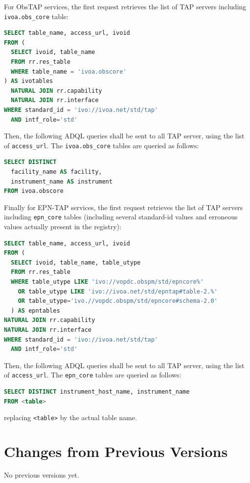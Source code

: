 \documentclass[11pt,a4paper]{ivoa}
\begin{document}
For ObsTAP services, the first request retrieves the list of TAP
servers including \texttt{ivoa.obs\_core} table:

\begin{lstlisting}[language=SQL]
SELECT table_name, access_url, ivoid 
FROM ( 
  SELECT ivoid, table_name 
  FROM rr.res_table 
  WHERE table_name = 'ivoa.obscore'
) AS ivotables
  NATURAL JOIN rr.capability
  NATURAL JOIN rr.interface 
WHERE standard_id = 'ivo://ivoa.net/std/tap' 
  AND intf_role='std'
\end{lstlisting}

Then, the following ADQL queries shall be sent to all TAP server, 
using the list of \texttt{access\_url}. The \texttt{ivoa.obs\_core} 
tables are queried as follows: 

\begin{lstlisting}[language=SQL]
SELECT DISTINCT 
  facility_name AS facility, 
  instrument_name AS instrument 
FROM ivoa.obscore
\end{lstlisting}

Finally for EPN-TAP services, the first request retrieves the list of TAP
servers including \texttt{epn\_core} tables (including several standard-id 
values and erroneous values actually present in the registry): 

\begin{lstlisting}[language=SQL]
SELECT table_name, access_url, ivoid 
FROM ( 
  SELECT ivoid, table_name, table_utype 
  FROM rr.res_table 
  WHERE table_utype LIKE 'ivo://vopdc.obspm/std/epncore%' 
    OR table_utype LIKE 'ivo://ivoa.net/std/epntap#table-2.%' 
    OR table_utype='ivo.//vopdc.obspm/std/epncore#schema-2.0'
  ) AS epntables
NATURAL JOIN rr.capability
NATURAL JOIN rr.interface 
WHERE standard_id = 'ivo://ivoa.net/std/tap' 
  AND intf_role='std'
\end{lstlisting}

Then, the following ADQL queries shall be sent to all TAP server, 
using the list of \texttt{access\_url}. The \texttt{epn\_core} 
tables are queried as follows: 

\begin{lstlisting}[language=SQL]
SELECT DISTINCT instrument_host_name, instrument_name 
FROM <table>
\end{lstlisting}
replacing \texttt{<table>} by the actual table name.


\section{Changes from Previous Versions}

No previous versions yet.  



\end{document}
